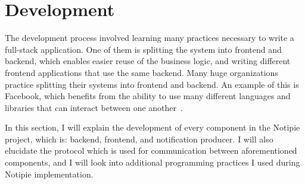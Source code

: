 \section{Development}\label{sec:development}

The development process involved learning many practices
necessary to write a full-stack application.
One of them is splitting the system
into frontend and backend, which
enables easier reuse of the business logic,
and writing different frontend applications
that use the same backend.
Many huge organizations practice splitting
their systems into frontend and backend.
An example of this is Facebook,
which benefits from the ability to use
many different languages and libraries
that can interact between one another~\cite{abdullah_frontend_2014}.

In this section,
I will explain the development of every component
in the Notipie project, which is:
backend,
frontend, and
notification producer.
I will also elucidate the protocol
which is used for communication between aforementioned components,
and I will look into additional programming practices
I used during Notipie implementation.






